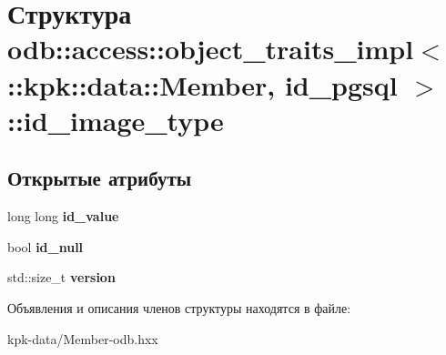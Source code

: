 \hypertarget{structodb_1_1access_1_1object__traits__impl_3_01_1_1kpk_1_1data_1_1_member_00_01id__pgsql_01_4_1_1id__image__type}{}\section{Структура odb\+:\+:access\+:\+:object\+\_\+traits\+\_\+impl$<$ \+:\+:kpk\+:\+:data\+:\+:Member, id\+\_\+pgsql $>$\+:\+:id\+\_\+image\+\_\+type}
\label{structodb_1_1access_1_1object__traits__impl_3_01_1_1kpk_1_1data_1_1_member_00_01id__pgsql_01_4_1_1id__image__type}
\subsection*{Открытые атрибуты}
\begin{DoxyCompactItemize}
\item 
long long {\bfseries id\+\_\+value}\hypertarget{structodb_1_1access_1_1object__traits__impl_3_01_1_1kpk_1_1data_1_1_member_00_01id__pgsql_01_4_1_1id__image__type_ada585245cb29ded5930d868bf75c62e3}{}\label{structodb_1_1access_1_1object__traits__impl_3_01_1_1kpk_1_1data_1_1_member_00_01id__pgsql_01_4_1_1id__image__type_ada585245cb29ded5930d868bf75c62e3}

\item 
bool {\bfseries id\+\_\+null}\hypertarget{structodb_1_1access_1_1object__traits__impl_3_01_1_1kpk_1_1data_1_1_member_00_01id__pgsql_01_4_1_1id__image__type_a8017b53cbda89c112b228d757d48dc19}{}\label{structodb_1_1access_1_1object__traits__impl_3_01_1_1kpk_1_1data_1_1_member_00_01id__pgsql_01_4_1_1id__image__type_a8017b53cbda89c112b228d757d48dc19}

\item 
std\+::size\+\_\+t {\bfseries version}\hypertarget{structodb_1_1access_1_1object__traits__impl_3_01_1_1kpk_1_1data_1_1_member_00_01id__pgsql_01_4_1_1id__image__type_a5fecb30d51ae41a93e0a9408bf3fd4ee}{}\label{structodb_1_1access_1_1object__traits__impl_3_01_1_1kpk_1_1data_1_1_member_00_01id__pgsql_01_4_1_1id__image__type_a5fecb30d51ae41a93e0a9408bf3fd4ee}

\end{DoxyCompactItemize}


Объявления и описания членов структуры находятся в файле\+:\begin{DoxyCompactItemize}
\item 
kpk-\/data/Member-\/odb.\+hxx\end{DoxyCompactItemize}
